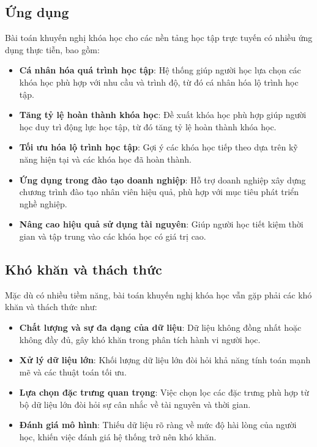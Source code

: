 \subsection{Ứng dụng}

Bài toán khuyến nghị khóa học cho các nền tảng học tập trực tuyến có nhiều ứng dụng thực tiễn, bao gồm:
\begin{itemize}
    \item \textbf{Cá nhân hóa quá trình học tập}: Hệ thống giúp người học lựa chọn các khóa học phù hợp với nhu cầu và trình độ, từ đó cá nhân hóa lộ trình học tập.
    \item \textbf{Tăng tỷ lệ hoàn thành khóa học}: Đề xuất khóa học phù hợp giúp người học duy trì động lực học tập, từ đó tăng tỷ lệ hoàn thành khóa học.
    \item \textbf{Tối ưu hóa lộ trình học tập}: Gợi ý các khóa học tiếp theo dựa trên kỹ năng hiện tại và các khóa học đã hoàn thành.
    \item \textbf{Ứng dụng trong đào tạo doanh nghiệp}: Hỗ trợ doanh nghiệp xây dựng chương trình đào tạo nhân viên hiệu quả, phù hợp với mục tiêu phát triển nghề nghiệp.
    \item \textbf{Nâng cao hiệu quả sử dụng tài nguyên}: Giúp người học tiết kiệm thời gian và tập trung vào các khóa học có giá trị cao.
\end{itemize}

\subsection{Khó khăn và thách thức}

Mặc dù có nhiều tiềm năng, bài toán khuyến nghị khóa học vẫn gặp phải các khó khăn và thách thức như:
\begin{itemize}
    \item \textbf{Chất lượng và sự đa dạng của dữ liệu}: Dữ liệu không đồng nhất hoặc không đầy đủ, gây khó khăn trong phân tích hành vi người học.
    \item \textbf{Xử lý dữ liệu lớn}: Khối lượng dữ liệu lớn đòi hỏi khả năng tính toán mạnh mẽ và các thuật toán tối ưu.
    \item \textbf{Lựa chọn đặc trưng quan trọng}: Việc chọn lọc các đặc trưng phù hợp từ bộ dữ liệu lớn đòi hỏi sự cân nhắc về tài nguyên và thời gian.
    \item \textbf{Đánh giá mô hình}: Thiếu dữ liệu rõ ràng về mức độ hài lòng của người học, khiến việc đánh giá hệ thống trở nên khó khăn.
\end{itemize}

